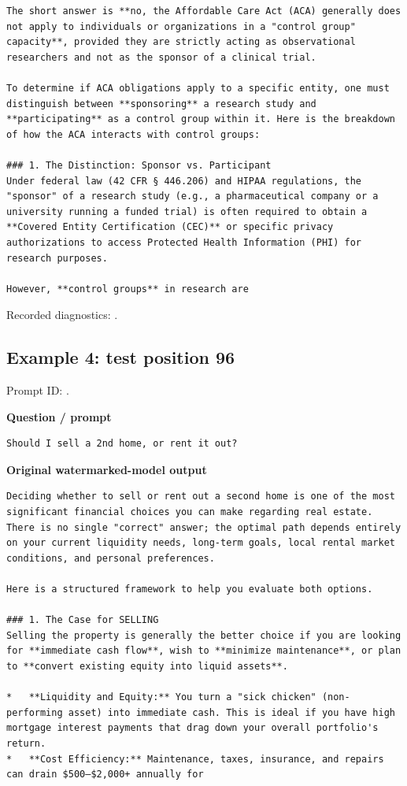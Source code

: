 \begin{Verbatim}
The short answer is **no, the Affordable Care Act (ACA) generally does not apply to individuals or organizations in a "control group" capacity**, provided they are strictly acting as observational researchers and not as the sponsor of a clinical trial.

To determine if ACA obligations apply to a specific entity, one must distinguish between **sponsoring** a research study and **participating** as a control group within it. Here is the breakdown of how the ACA interacts with control groups:

### 1. The Distinction: Sponsor vs. Participant
Under federal law (42 CFR § 446.206) and HIPAA regulations, the "sponsor" of a research study (e.g., a pharmaceutical company or a university running a funded trial) is often required to obtain a **Covered Entity Certification (CEC)** or specific privacy authorizations to access Protected Health Information (PHI) for research purposes.

However, **control groups** in research are
\end{Verbatim}

Recorded diagnostics:
\texttt{}.

\subsection{Example 4: test position
96}\label{record-docs-watermarking-qualitative-text-textseal2-direct-topk-md-example-4-test-position-96}

Prompt ID:
\texttt{}.

\textbf{Question / prompt}

\begin{Verbatim}
Should I sell a 2nd home, or rent it out?
\end{Verbatim}

\textbf{Original watermarked-model output}

\begin{Verbatim}
Deciding whether to sell or rent out a second home is one of the most significant financial choices you can make regarding real estate. There is no single "correct" answer; the optimal path depends entirely on your current liquidity needs, long-term goals, local rental market conditions, and personal preferences.

Here is a structured framework to help you evaluate both options.

### 1. The Case for SELLING
Selling the property is generally the better choice if you are looking for **immediate cash flow**, wish to **minimize maintenance**, or plan to **convert existing equity into liquid assets**.

*   **Liquidity and Equity:** You turn a "sick chicken" (non-performing asset) into immediate cash. This is ideal if you have high mortgage interest payments that drag down your overall portfolio's return.
*   **Cost Efficiency:** Maintenance, taxes, insurance, and repairs can drain $500–$2,000+ annually for
\end{Verbatim}

